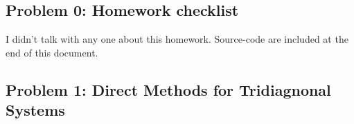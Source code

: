\documentclass{article}
\begin{document}
 



\hypertarget{problem_0_homework_checklist_2}{}
\subsection*{{Problem 0: Homework checklist}}
\label{problem_0_homework_checklist_2}

\checkmark	I didn't talk with any one about this homework. \newline
\checkmark 	Source-code are included at the end of this document. 



\hypertarget{problem_0_homework_checklist_2}{}
\subsection*{{Problem 1: Direct Methods for Tridiagnonal Systems }}
\label{}



\hypertarget{problem_0_homework_checklist_2}{}
\end{document}
